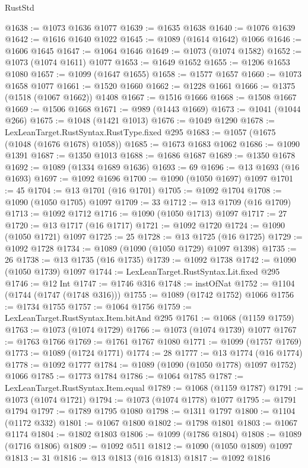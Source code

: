 \begin{lexlean}{RustStd}
\begin{coremodule}
{\begin{coremodule}
{{{{{{{{{{{{{{@1638 := @1073 @1636 @1077
@1639 := @1635 @1638
@1640 := @1076 @1639
@1642 := @1616 @1640 @1022
@1645 := @1089 (@1614 @1642) @1066
@1646 := @1606 @1645
@1647 := @1064 @1646
@1649 := @1073 (@1074 @1582)
@1652 := @1073 (@1074 @1611) @1077
@1653 := @1649 @1652
@1655 := @1206 @1653 @1080
@1657 := @1099 (@1647 @1655)
@1658 := @1577 @1657
@1660 := @1073 @1658 @1077
@1661 := @1520 @1660
@1662 := @1228 @1661
@1666 := @1375 (@1518 (@1067 @1662)) @1408
@1667 := @1516 @1666
@1668 := @1508 @1667
@1669 := @1506 @1668
@1671 := @989 (@1443 @1669)
@1673 := @1041 (@1044 @266)
@1675 := @1048 (@1421 @1013)
@1676 := @1049 @1290
@1678 := LexLeanTarget.RustSyntax.RustType.fixed @295
@1683 := @1057 (@1675 (@1048 (@1676 @1678) @1058))
@1685 := @1673 @1683 @1062
@1686 := @1090 @1391
@1687 := @1350 @1013
@1688 := @1686 @1687
@1689 := @1350 @1678
@1692 := @1089 (@1334 @1689 @1636)
@1693 := 69
@1696 := @13 @1693 (@16 @1693)
@1697 := @1092 @1696
@1700 := @1090 (@1050 @1697) @1097
@1701 := 45
@1704 := @13 @1701 (@16 @1701)
@1705 := @1092 @1704
@1708 := @1090 (@1050 @1705) @1097
@1709 := 33
@1712 := @13 @1709 (@16 @1709)
@1713 := @1092 @1712
@1716 := @1090 (@1050 @1713) @1097
@1717 := 27
@1720 := @13 @1717 (@16 @1717)
@1721 := @1092 @1720
@1724 := @1090 (@1050 @1721) @1097
@1725 := 25
@1728 := @13 @1725 (@16 @1725)
@1729 := @1092 @1728
@1734 := @1089 (@1090 (@1050 @1729) @1097 @1398)
@1735 := 26
@1738 := @13 @1735 (@16 @1735)
@1739 := @1092 @1738
@1742 := @1090 (@1050 @1739) @1097
@1744 := LexLeanTarget.RustSyntax.Lit.fixed @295
@1746 := @12 Int
@1747 := @1746 @316
@1748 := instOfNat
@1752 := @1104 (@1744 (@1747 (@1748 @316)))
@1755 := @1089 (@1742 @1752) @1066
@1756 := @1734 @1755
@1757 := @1064 @1756
@1759 := LexLeanTarget.RustSyntax.Item.bitAnd @295
@1761 := @1068 (@1159 @1759)
@1763 := @1073 (@1074 @1729)
@1766 := @1073 (@1074 @1739) @1077
@1767 := @1763 @1766
@1769 := @1761 @1767 @1080
@1771 := @1099 (@1757 @1769)
@1773 := @1089 (@1724 @1771)
@1774 := 28
@1777 := @13 @1774 (@16 @1774)
@1778 := @1092 @1777
@1784 := @1089 (@1090 (@1050 @1778) @1097 @1752) @1066
@1785 := @1773 @1784
@1786 := @1064 @1785
@1787 := LexLeanTarget.RustSyntax.Item.equal
@1789 := @1068 (@1159 @1787)
@1791 := @1073 (@1074 @1721)
@1794 := @1073 (@1074 @1778) @1077
@1795 := @1791 @1794
@1797 := @1789 @1795 @1080
@1798 := @1311 @1797
@1800 := @1104 (@1172 @332)
@1801 := @1067 @1800
@1802 := @1798 @1801
@1803 := @1067 @1174
@1804 := @1802 @1803
@1806 := @1099 (@1786 @1804)
@1808 := @1089 (@1716 @1806)
@1809 := @1092 @511
@1812 := @1090 (@1050 @1809) @1097
@1813 := 31
@1816 := @13 @1813 (@16 @1813)
@1817 := @1092 @1816
}}}}}}}}}}}}}}
\end{coremodule}}
\end{coremodule}
\end{lexlean}
